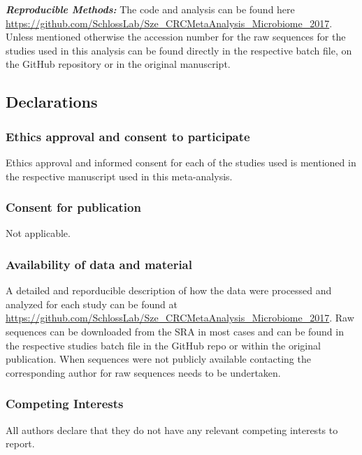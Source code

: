 \documentclass[12pt,]{article}
\begin{document}
\textbf{\emph{Reproducible Methods:}} The code and analysis can be found
here
\url{https://github.com/SchlossLab/Sze_CRCMetaAnalysis_Microbiome_2017}.
Unless mentioned otherwise the accession number for the raw sequences
for the studies used in this analysis can be found directly in the
respective batch file, on the GitHub repository or in the original
manuscript.

\newpage

\subsection{Declarations}\label{declarations}

\subsubsection{Ethics approval and consent to
participate}\label{ethics-approval-and-consent-to-participate}

Ethics approval and informed consent for each of the studies used is
mentioned in the respective manuscript used in this meta-analysis.

\subsubsection{Consent for publication}\label{consent-for-publication}

Not applicable.

\subsubsection{Availability of data and
material}\label{availability-of-data-and-material}

A detailed and reporducible description of how the data were processed
and analyzed for each study can be found at
\url{https://github.com/SchlossLab/Sze_CRCMetaAnalysis_Microbiome_2017}.
Raw sequences can be downloaded from the SRA in most cases and can be
found in the respective studies batch file in the GitHub repo or within
the original publication. When sequences were not publicly available
contacting the corresponding author for raw sequences needs to be
undertaken.

\subsubsection{Competing Interests}\label{competing-interests}

All authors declare that they do not have any relevant competing
interests to report.
\end{document}
